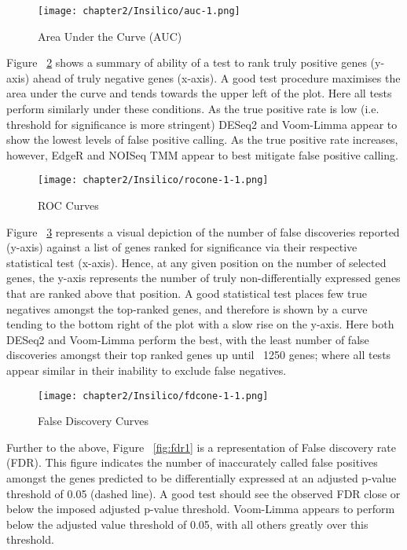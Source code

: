 \begin{figure}[!htbp]
\centering 
\texttt{[image: chapter2/Insilico/auc-1.png]} \\
\caption[n=3 Area Under the Curve (AUC)]{Area Under the Curve (AUC)}
\label{fig:auc}
\end{figure}

Figure ~\ref{fig:roc} shows a summary of ability of a test to rank truly positive genes (y-axis) ahead of truly negative genes (x-axis). A good test procedure maximises the area under the curve and tends towards the upper left of the plot. Here all tests perform similarly under these conditions. As the true positive rate is low (i.e. threshold for significance is more stringent) DESeq2 and Voom-Limma appear to show the lowest levels of false positive calling. As the true positive rate increases, however, EdgeR and NOISeq TMM appear to best mitigate false positive calling. \\

\begin{figure}[!htbp]
  \centering 
  \texttt{[image: chapter2/Insilico/rocone-1-1.png]}
  \caption[n=3 ROC Curves]{ROC Curves}
  \label{fig:roc}
\end{figure} 

Figure  ~\ref{fig:fdr} represents a visual depiction of the number of false discoveries reported (y-axis) against a list of genes ranked for significance via their respective statistical test (x-axis). Hence, at any given position on the number of selected genes, the y-axis represents the number of truly non-differentially expressed genes that are ranked above that position. A good statistical test places few true negatives amongst the top-ranked genes, and therefore is shown by a curve tending to the bottom right of the plot with a slow rise on the y-axis. Here both DESeq2 and Voom-Limma perform the best, with the least number of false discoveries amongst their top ranked genes up until ~1250 genes; where all tests appear similar in their inability to exclude false negatives. \\

\begin{figure}[!htbp]
  \centering 
  \texttt{[image: chapter2/Insilico/fdcone-1-1.png]}
  \caption[n=3 False Discovery Curves]{False Discovery Curves}
  \label{fig:fdr}
\end{figure} 

Further to the above, Figure ~\ref{fig:fdr1} is a representation of False discovery rate (FDR). This figure indicates the number of inaccurately called false positives amongst the genes predicted to be differentially expressed at an adjusted p-value threshold of 0.05 (dashed line). A good test should see the observed FDR close or below the imposed adjusted p-value threshold. Voom-Limma appears to perform below the adjusted value threshold of 0.05, with all others greatly over this threshold. \\

